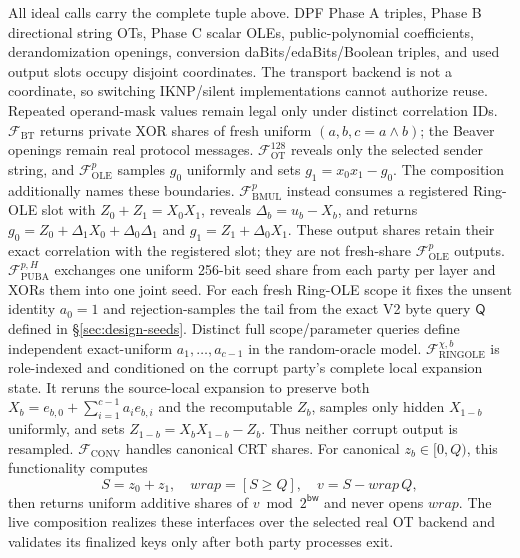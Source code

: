 \documentclass[11pt]{article}
\newcommand{\bw}{\mathsf{bw}}
\begin{document}
All ideal calls carry the complete tuple above.  DPF Phase A triples, Phase B
directional string OTs, Phase C scalar OLEs, public-polynomial coefficients,
derandomization openings, conversion daBits/edaBits/Boolean triples, and used
output slots occupy disjoint coordinates.  The transport backend is not a
coordinate, so switching IKNP/silent implementations cannot authorize reuse.
Repeated operand-mask values remain legal only under distinct correlation IDs.
$\mathcal F_{\mathrm{BT}}$ returns private XOR shares of fresh uniform
$(a,b,c=a\wedge b)$; the Beaver openings remain real protocol messages.
$\mathcal F_{\mathrm{OT}}^{128}$ reveals only the selected sender string, and
$\mathcal F_{\mathrm{OLE}}^p$ samples $g_0$ uniformly and sets
$g_1=x_0x_1-g_0$. The composition additionally names these boundaries.
$\mathcal F_{\mathrm{BMUL}}^p$ instead consumes a registered Ring-OLE slot
with $Z_0+Z_1=X_0X_1$, reveals $\Delta_b=u_b-X_b$, and returns
$g_0=Z_0+\Delta_1X_0+\Delta_0\Delta_1$ and
$g_1=Z_1+\Delta_0X_1$. These output shares retain their exact correlation
with the registered slot; they are not fresh-share
$\mathcal F_{\mathrm{OLE}}^p$ outputs.
$\mathcal F_{\mathrm{PUBA}}^{p,H}$ exchanges one uniform 256-bit seed share
from each party per layer and XORs them into one joint seed. For each fresh
Ring-OLE scope it fixes the unsent identity $a_0=1$ and rejection-samples the
tail from the exact V2 byte query $\mathsf Q$ defined in
\S\ref{sec:design-seeds}. Distinct full scope/parameter queries define
independent exact-uniform $a_1,\ldots,a_{c-1}$ in the random-oracle model.
$\mathcal F_{\mathrm{RINGOLE}}^{\chi,b}$ is role-indexed and conditioned on
the corrupt party's complete local expansion state. It reruns the source-local
expansion to preserve both
$X_b=e_{b,0}+\sum_{i=1}^{c-1}a_i e_{b,i}$ and the recomputable $Z_b$, samples
only hidden $X_{1-b}$ uniformly, and sets
$Z_{1-b}=X_bX_{1-b}-Z_b$. Thus neither corrupt output is resampled.
$\mathcal F_{\mathrm{CONV}}$ handles canonical CRT shares. For canonical
$z_b\in[0,Q)$, this functionality computes
\[
 S=z_0+z_1,\quad \mathit{wrap}=[S\ge Q],\quad
 v=S-\mathit{wrap}\,Q,
\]
then returns uniform additive shares of $v\bmod 2^\bw$ and never opens
$\mathit{wrap}$. The live composition realizes these interfaces over the
selected real OT backend and validates its finalized keys only after both party
processes exit.
\end{document}

